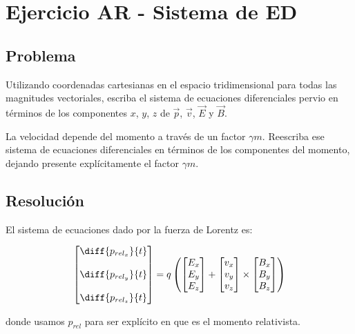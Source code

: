 \section{Ejercicio AR - Sistema de ED}

\subsection{Problema}

Utilizando coordenadas cartesianas en el espacio tridimensional para todas las magnitudes vectoriales, escriba el sistema de ecuaciones diferenciales pervio en términos de los componentes $x$, $y$, $z$ de $\vec{p}$, $\vec{v}$, $\vec{E}$ y $\vec{B}$.

La velocidad depende del momento a través de un factor $\gamma m$. Reescriba ese sistema de ecuaciones diferenciales en términos de los componentes del momento, dejando presente explícitamente el factor $\gamma m$.

\subsection{Resolución}

El sistema de ecuaciones dado por la fuerza de Lorentz es:

\begin{equation*}
\begin{bmatrix} 
	\diff{p_{rel_x}}{t} \\ \\
	\diff{p_{rel_y}}{t} \\ \\ 
	\diff{p_{rel_z}}{t} 
\end{bmatrix} = 
q \left( 
\begin{bmatrix} 
	E_x \\ E_y \\ E_z 
\end{bmatrix} + 
\begin{bmatrix} 
	v_x \\ v_y \\ v_z 
\end{bmatrix} 
	\times 
\begin{bmatrix} B_x \\ B_y \\ B_z \end{bmatrix} 
\right)
\end{equation*}

donde usamos $p_{rel}$ para ser explícito en que es el momento relativista.

